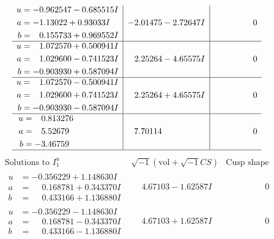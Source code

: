 \documentclass[1p]{elsarticle_modified}
\theoremstyle{definition}
\newcommand{\I}{\sqrt{-1}}
\begin{document}
$$\begin{array}{c|c|c}
\begin{aligned}
u &= -0.962547 - 0.685515 I \\
a &= -1.13022 + 0.93033 I \\
b &= \phantom{-}0.155733 + 0.969552 I\end{aligned}
 & -2.01475 - 2.72647 I & \phantom{-0.000000 } 0 \\ \hline\begin{aligned}
u &= \phantom{-}1.072570 + 0.500941 I \\
a &= \phantom{-}1.029600 - 0.741523 I \\
b &= -0.903930 + 0.587094 I\end{aligned}
 & \phantom{-}2.25264 - 4.65575 I & \phantom{-0.000000 } 0 \\ \hline\begin{aligned}
u &= \phantom{-}1.072570 - 0.500941 I \\
a &= \phantom{-}1.029600 + 0.741523 I \\
b &= -0.903930 - 0.587094 I\end{aligned}
 & \phantom{-}2.25264 + 4.65575 I & \phantom{-0.000000 } 0 \\ \hline\begin{aligned}
u &= \phantom{-}0.813276\phantom{ +0.000000I} \\
a &= \phantom{-}5.52679\phantom{ +0.000000I} \\
b &= -3.46759\phantom{ +0.000000I}\end{aligned}
 & \phantom{-}7.70114\phantom{ +0.000000I} & \phantom{-0.000000 } 0\\
 \hline 
 \end{array}$$\newpage$$\begin{array}{c|c|c}  
\text{Solutions to }I^u_{1}& \I (\text{vol} + \sqrt{-1}CS) & \text{Cusp shape}\\
 \hline 
\begin{aligned}
u &= -0.356229 + 1.148630 I \\
a &= \phantom{-}0.168781 + 0.343370 I \\
b &= \phantom{-}0.433166 + 1.136880 I\end{aligned}
 & \phantom{-}4.67103 - 1.62587 I & \phantom{-0.000000 } 0 \\ \hline\begin{aligned}
u &= -0.356229 - 1.148630 I \\
a &= \phantom{-}0.168781 - 0.343370 I \\
b &= \phantom{-}0.433166 - 1.136880 I\end{aligned}
 & \phantom{-}4.67103 + 1.62587 I & \phantom{-0.000000 } 0 \\ \hline\begin{aligned}

\end{aligned}
\end{array}$$
\end{document}
